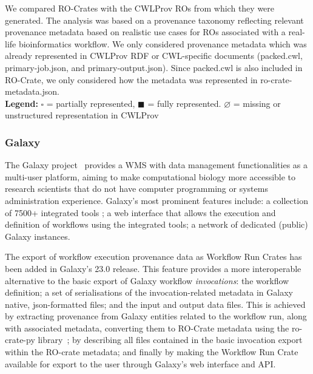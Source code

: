 \begin{table}[!ht]
\begin{tabular}{r|l|l|c|c|c}
\end{tabular}
\begin{flushleft} We compared RO-Crates with the CWLProv ROs from which they were generated.
The analysis was based on a provenance taxonomy reflecting relevant provenance metadata based on realistic use cases for ROs associated with a real-life bioinformatics workflow.
We only considered provenance metadata which was already represented in CWLProv RDF or CWL-specific documents (packed.cwl, primary-job.json, and primary-output.json).
Since packed.cwl is also included in RO-Crate, we only considered how the metadata was represented in ro-crate-metadata.json.\\
\textbf{Legend:} $\square$ = partially represented, $\blacksquare$ = fully represented. $\varnothing$ = missing or unstructured representation in CWLProv
\end{flushleft}
\label{ch54:analysis_table}
\end{table}


\subsubsection{Galaxy}\label{ch54:galaxy}

The Galaxy project~\cite{Galaxy 2022} provides a WMS with data management functionalities as a multi-user platform, aiming to make computational biology more accessible to research scientists that do not have computer programming or systems administration experience.
Galaxy's most prominent features include: a collection of 7500+ integrated tools ;
a web interface that allows the execution and definition of workflows using the integrated tools; a network of dedicated (public) Galaxy instances.

The export of workflow execution provenance data as Workflow Run Crates has been added in Galaxy's 23.0 release.
This feature provides a more interoperable alternative to the basic export of Galaxy workflow
\emph{invocations}: the workflow definition; a set of serialisations of the invocation-related metadata in Galaxy native, json-formatted files;
and the input and output data files.
This is achieved by extracting provenance from Galaxy entities related to the workflow run, along with associated metadata, converting them to RO-Crate metadata using the ro-crate-py library~\cite{ro-crate-py}; by describing all files contained in the basic invocation export within the RO-crate metadata;
and finally by making the Workflow Run Crate available for export to the user through Galaxy's web interface and API.

